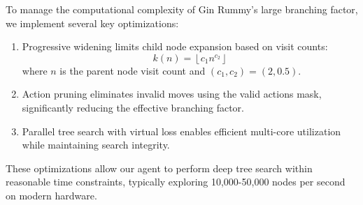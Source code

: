 To manage the computational complexity of Gin Rummy's large branching factor, we implement several key optimizations:

\begin{enumerate}
\item Progressive widening limits child node expansion based on visit counts:
\[
k(n) = \left\lfloor c_1 n^{c_2} \right\rfloor
\]
where $n$ is the parent node visit count and $(c_1, c_2) = (2, 0.5)$.

\item Action pruning eliminates invalid moves using the valid actions mask, significantly reducing the effective branching factor.

\item Parallel tree search with virtual loss enables efficient multi-core utilization while maintaining search integrity.
\end{enumerate}

These optimizations allow our agent to perform deep tree search within reasonable time constraints, typically exploring 10,000-50,000 nodes per second on modern hardware. 